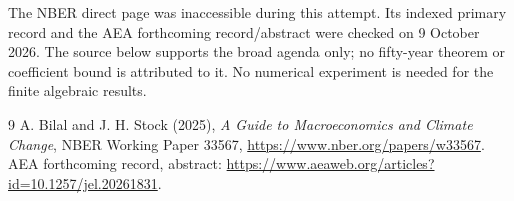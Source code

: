 \documentclass[11pt]{article}
\begin{document}
The NBER direct page was inaccessible during this attempt. Its indexed
primary record and the AEA forthcoming record/abstract were checked on
9 October 2026. The source below supports the broad agenda only; no
fifty-year theorem or coefficient bound is attributed to it. No numerical
experiment is needed for the finite algebraic results.
\begin{thebibliography}{9}
 A. Bilal and J. H. Stock (2025),
\emph{A Guide to Macroeconomics and Climate Change}, NBER Working Paper
33567, \url{https://www.nber.org/papers/w33567}.
AEA forthcoming record, abstract:
\url{https://www.aeaweb.org/articles?id=10.1257/jel.20261831}.
\end{thebibliography}
\end{document}
